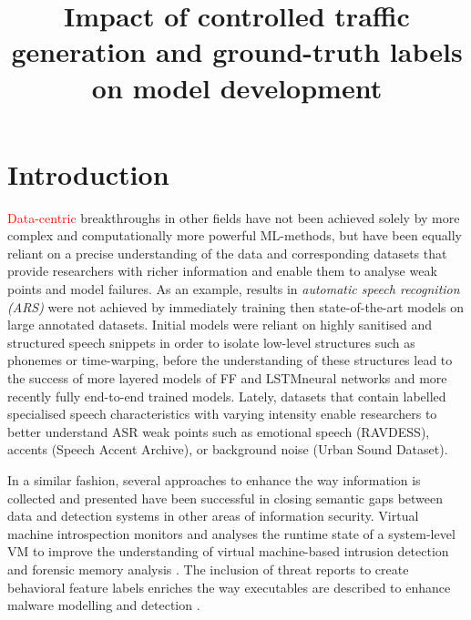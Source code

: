\documentclass[sigconf]{acmart}
\begin{document}
 

\title{Impact of controlled traffic generation and ground-truth labels on model development}

\maketitle







\section{Introduction}

\textcolor{red}{Data-centric} breakthroughs in other fields have not been achieved solely by more complex and computationally more powerful ML-methods, but have been equally reliant on a precise understanding of the data and corresponding datasets that provide researchers with richer information and enable them to analyse weak points and model failures. As an example, results in \textit{automatic speech recognition (ARS)} were not achieved by immediately training then state-of-the-art models on large annotated datasets. Initial models were reliant on highly sanitised and structured speech snippets in order to isolate low-level structures such as phonemes or time-warping, before the understanding of these structures lead to the success of more layered models of FF and LSTMneural networks and more recently fully end-to-end trained models. Lately, datasets that contain labelled specialised speech characteristics with varying intensity enable researchers to better understand ASR weak points such as emotional speech (RAVDESS), accents (Speech Accent Archive), or background noise (Urban Sound Dataset).

In a similar fashion, several approaches to enhance the way information is collected and presented have been successful in closing semantic gaps between data and detection systems in other areas of information security. Virtual machine introspection monitors and analyses the runtime state of a system-level VM to improve the understanding of virtual machine-based intrusion detection and forensic memory analysis \cite{dolan2011virtuoso}. The inclusion of threat reports to create behavioral feature labels enriches the way executables are described to enhance malware modelling and detection \cite{smith2020mind}.
\end{document}
